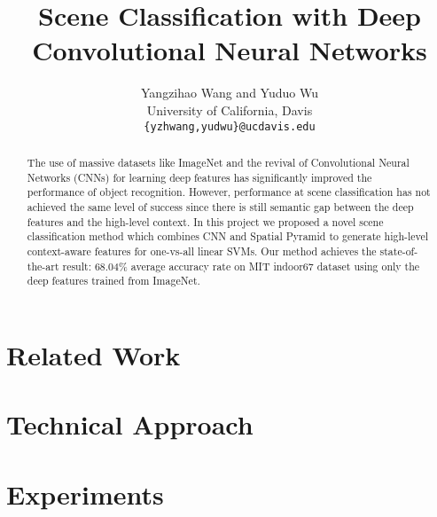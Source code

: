 \documentclass[10pt,twocolumn,letterpaper]{article}
\begin{document}
\title{Scene Classification with Deep Convolutional Neural Networks}

\author{Yangzihao Wang and Yuduo Wu\\
University of California, Davis\\
{\tt\small \{yzhwang,yudwu\}@ucdavis.edu}
}
\maketitle

\begin{abstract}
The use of massive datasets like ImageNet and the revival of Convolutional
Neural Networks (CNNs) for learning deep features has significantly improved
the performance of object recognition. However, performance at scene
classification has not achieved the same level of success since there is still
semantic gap between the deep features and the high-level context.  In this
project we proposed a novel scene classification method which combines CNN and
Spatial Pyramid to generate high-level context-aware features for one-vs-all
linear SVMs. Our method achieves the state-of-the-art result: 68.04\% average
accuracy rate on MIT indoor67 dataset using only the deep features trained from
ImageNet.

\end{abstract}

\section{Related Work}
\label{sec:related}


\section{Technical Approach}
\label{sec:method}


\section{Experiments}
\label{sec:results}

\end{document}
